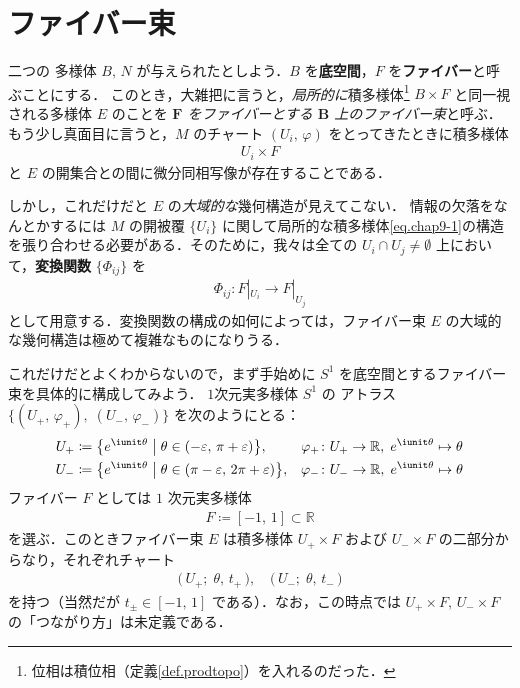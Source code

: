 \documentclass[geometry_main]{subfiles}
\begin{document}
\setcounter{chapter}{8}

\chapter{ファイバー束}

二つの \cinfty 多様体 $B,\, N$ が与えられたとしよう．$B$ を\textbf{底空間}，$F$ を\textbf{ファイバー}と呼ぶことにする．
このとき，大雑把に言うと，\emph{局所的に}積多様体\footnote{位相は積位相（定義\ref{def.prodtopo}）を入れるのだった．} $B \times F$ と同一視される\cinfty 多様体 $E$ のことを \emph{$\bm{F}$ をファイバーとする $\bm{B}$ 上のファイバー束}と呼ぶ．もう少し真面目に言うと，$M$ のチャート $(U_i,\, \varphi)$ をとってきたときに積多様体
\begin{align}
	\label{eq.chap9-1}
	U_i \times F
\end{align}
と $E$ の開集合との間に微分同相写像が存在することである．

しかし，これだけだと $E$ の\emph{大域的な}幾何構造が見えてこない．
情報の欠落をなんとかするには $M$ の開被覆 $\{ U_i \}$ に関して局所的な積多様体\eqref{eq.chap9-1}の構造を張り合わせる必要がある．そのために，我々は全ての $U_i \cap U_j \neq \emptyset$ 上において，\textbf{変換関数} $\{\Phi_{ij}\}$ を
\begin{align}
	\Phi_{ij} \colon F|_{U_i} \to F|_{U_j}
\end{align}
として用意する．変換関数の構成の如何によっては，ファイバー束 $E$ の大域的な幾何構造は極めて複雑なものになりうる．

これだけだとよくわからないので，まず手始めに $S^1$ を底空間とするファイバー束を具体的に構成してみよう．
$1$次元実多様体 $S^1$ の \cinfty アトラス $\{(U_+,\, \varphi_+),\; (U_-,\, \varphi_-)\}$ を次のようにとる：
\begin{align}
	U_+ &\coloneqq \bigl\{ e^{\iunit \theta} \bigm| \theta \in (-\varepsilon,\, \pi + \varepsilon) \bigr\}, & \varphi_+ &\colon U_+ \to \mathbb{R},\; e^{\iunit \theta} \mapsto \theta \\
	U_- &\coloneqq \bigl\{ e^{\iunit \theta} \bigm| \theta \in (\pi -\varepsilon,\, 2\pi + \varepsilon) \bigr\}, & \varphi_- &\colon U_- \to \mathbb{R},\; e^{\iunit \theta} \mapsto \theta \\
\end{align}
ファイバー $F$ としては $1$ 次元実多様体
\begin{align}
	F \coloneqq [-1,\, 1] \subset \mathbb{R}
\end{align}
を選ぶ．このときファイバー束 $E$ は積多様体 $U_+ \times F$ および $U_- \times F$ の二部分からなり，それぞれチャート
\begin{align}
	\bigl(\, U_+;\; \theta,\, t_+\, \bigr),\quad \bigl(\, U_-;\; \theta,\, t_-\, \bigr)
\end{align}
を持つ（当然だが $t_{\pm} \in [-1,\, 1]$ である）．なお，この時点では $U_+ \times F,\, U_- \times F$ の「つながり方」は未定義である．
\end{document}
